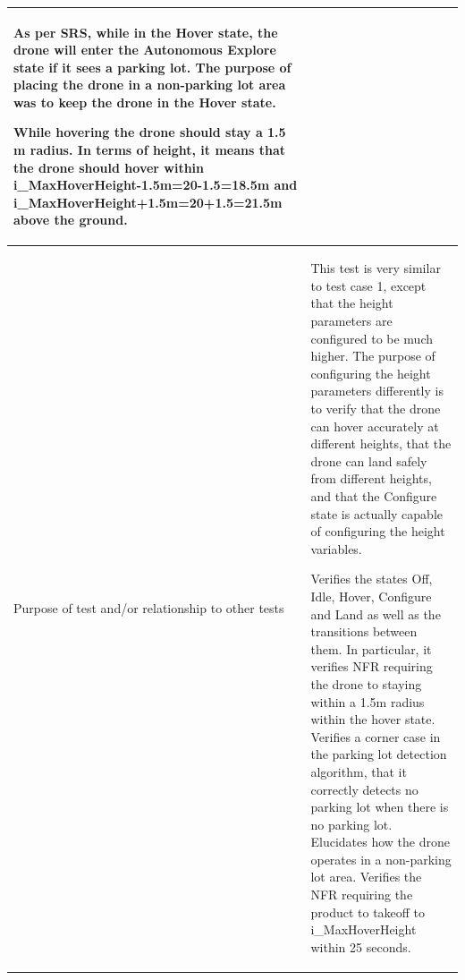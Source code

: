\documentclass[12pt, titlepage]{article}
\begin{document}
\begin{enumerate}
\begin{table}[!h]
\begin{center}
\begin{tabular}{ | m{1.5cm} | m{15cm} | }
As per SRS, while in the Hover state, the drone will enter the Autonomous Explore state if it sees a parking lot. The purpose of placing the drone in a non-parking lot area was to keep the drone in the Hover state.

While hovering the drone should stay a 1.5 m radius. In terms of height, it means that the drone should hover within i\_MaxHoverHeight-1.5m=20-1.5=18.5m and i\_MaxHoverHeight+1.5m=20+1.5=21.5m above the ground.  \\ 
\hline
Purpose of test and/or relationship to other tests & This test is very similar to test case 1, except that the height parameters are configured to be much higher. The purpose of configuring the height parameters differently is to verify that the drone can hover accurately at different heights, that the drone can land safely from different heights, and that the Configure state is actually capable of configuring the height variables.

Verifies the states Off, Idle, Hover, Configure and Land as well as the transitions between them. In particular, it verifies NFR requiring the drone to staying within a 1.5m radius within the hover state. 
Verifies a corner case in the parking lot detection algorithm, that it correctly detects no parking lot when there is no parking lot.
Elucidates how the drone operates in a non-parking lot area.
Verifies the NFR requiring the product to takeoff to i\_MaxHoverHeight within 25 seconds. \\ 
\hline
\end{tabular}
\end{center}
\end{table}



\end{enumerate}
\end{document}
